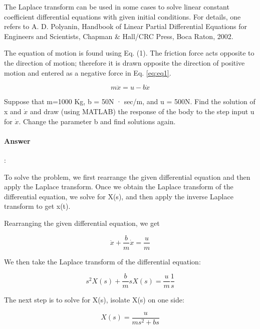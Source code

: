\documentclass{article}
\begin{document}
\begin{tcolorbox}
  The Laplace transform can be used in some cases to solve linear constant coeﬀicient differential equations with given initial conditions. For details, one refers to A. D. Polyanin, Handbook of Linear Partial Differential Equations for Engineers and Scientists, Chapman \& Hall/CRC Press, Boca Raton, 2002.
\end{tcolorbox}

The equation of motion is found using Eq. (1). The friction force acts opposite to the direction of motion; therefore it is drawn opposite the direction of positive motion and entered as a negative force in Eq. \eqref{eq:eq1}.

\begin{equation}
  m\ddot{x} = u - b\dot{x}
  \label{eq:eq1}
\end{equation}

Suppose that m=1000 Kg, b = 50N · sec/m, and u = 500N. Find the solution of x and $\dot{x}$ and draw (using MATLAB) the response of the body to the step input u for $\dot{x}$. Change the parameter b and find solutions again.

\paragraph{Answer}:

To solve the problem, we first rearrange the given differential equation and then apply the Laplace transform. Once we obtain the Laplace transform of the differential equation, we solve for X(s), and then apply the inverse Laplace transform to get x(t).

Rearranging the given differential equation, we get

\begin{equation*}
  \ddot{x} + \frac{b}{m}\dot{x} = \frac{u}{m}
\end{equation*}

We then take the Laplace transform of the differential equation:

\begin{equation*}
  s^2X(s) + \frac{b}{m}sX(s) = \frac{u}{m}\frac{1}{s}
\end{equation*}


The next step is to solve for X(s), isolate X(s) on one side:

\begin{equation*}
  X(s) = \frac{u}{ms^2 + bs}
\end{equation*}
\end{document}
